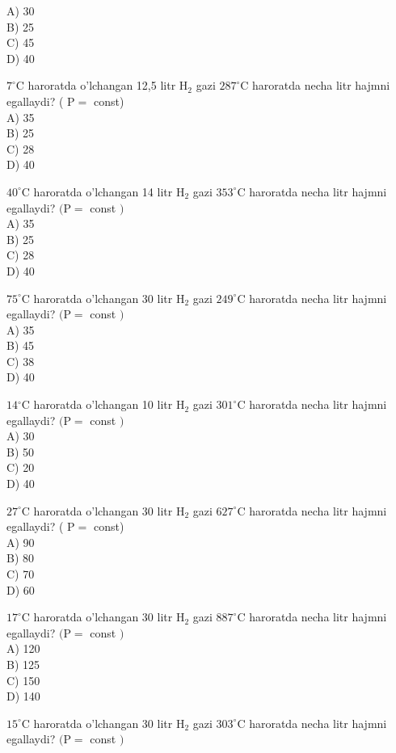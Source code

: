 A) 30\\
B) 25\\
C) 45\\
D) 40
  \item $7^{\circ} \mathrm{C}$ haroratda o'lchangan 12,5 litr $\mathrm{H}_{2}$ gazi $287^{\circ} \mathrm{C}$ haroratda necha litr hajmni egallaydi? ( $\mathrm{P}=$ const)\\
A) 35\\
B) 25\\
C) 28\\
D) 40
  \item $40^{\circ} \mathrm{C}$ haroratda o'lchangan 14 litr $\mathrm{H}_{2}$ gazi $353^{\circ} \mathrm{C}$ haroratda necha litr hajmni egallaydi? $(\mathrm{P}=$ const $)$\\
A) 35\\
B) 25\\
C) 28\\
D) 40
  \item $75^{\circ} \mathrm{C}$ haroratda o'lchangan 30 litr $\mathrm{H}_{2}$ gazi $249^{\circ} \mathrm{C}$ haroratda necha litr hajmni egallaydi? $(\mathrm{P}=$ const $)$\\
A) 35\\
B) 45\\
C) 38\\
D) 40
  \item $14{ }^{\circ} \mathrm{C}$ haroratda o'lchangan 10 litr $\mathrm{H}_{2}$ gazi $301^{\circ} \mathrm{C}$ haroratda necha litr hajmni egallaydi? $(\mathrm{P}=$ const $)$\\
A) 30\\
B) 50\\
C) 20\\
D) 40
  \item $27^{\circ} \mathrm{C}$ haroratda o'lchangan 30 litr $\mathrm{H}_{2}$ gazi $627^{\circ} \mathrm{C}$ haroratda necha litr hajmni egallaydi? ( $\mathrm{P}=$ const)\\
A) 90\\
B) 80\\
C) 70\\
D) 60
  \item $17^{\circ} \mathrm{C}$ haroratda o'lchangan 30 litr $\mathrm{H}_{2}$ gazi $887^{\circ} \mathrm{C}$ haroratda necha litr hajmni egallaydi? $(\mathrm{P}=$ const $)$\\
A) 120\\
B) 125\\
C) 150\\
D) 140
  \item $15^{\circ} \mathrm{C}$ haroratda o'lchangan 30 litr $\mathrm{H}_{2}$ gazi $303^{\circ} \mathrm{C}$ haroratda necha litr hajmni egallaydi? $(\mathrm{P}=$ const $)$\\

